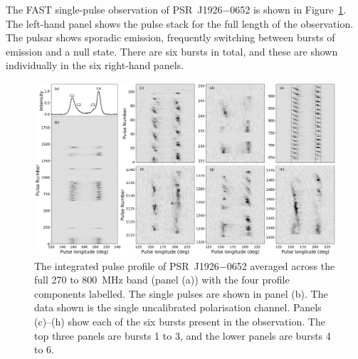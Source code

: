 The FAST single-pulse observation of PSR~J1926$-$0652 is shown in Figure~\ref{fig: J1926 - pulse stack}. The left-hand panel shows the pulse stack for the full length of the observation. The pulsar shows sporadic emission, frequently switching between bursts of emission and a null state. There are six bursts in total, and these are shown individually in the six right-hand panels.
\begin{landscape}
    \begin{figure}
        \begin{center}
            \includegraphics[height=0.8\textwidth]{Figures/J1926/stack.png}
            \caption[Pulse stacks of PSR~J1926$-$0652 as seen with FAST]{The integrated pulse profile of PSR~J1926$-$0652 averaged across the full 270 to 800~MHz band (panel (a)) with the four profile components labelled. The single pulses are shown in panel (b). The data shown is the single uncalibrated polarisation channel. Panels (c)--(h) show each of the six bursts present in the observation. The top three panels are bursts 1 to 3, and the lower panels are bursts 4 to 6.}
            \label{fig: J1926 - pulse stack}
        \end{center}
    \end{figure}
\end{landscape}

